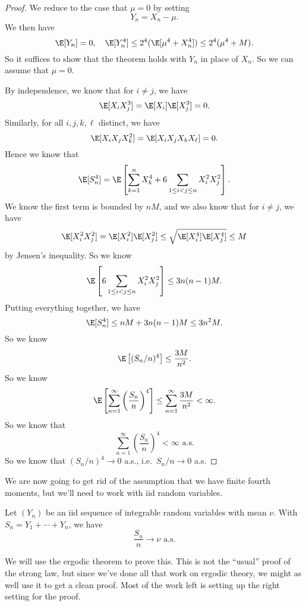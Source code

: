 \documentclass[a4paper]{article}
\begin{document}
\begin{proof}
  We reduce to the case that $\mu = 0$ by setting
  \[
    Y_n = X_n - \mu.
  \]
  We then have
  \[
    \E[Y_n] = 0,\quad \E[Y_n^4] \leq 2^4(\E[\mu^4 + X_n^4]) \leq 2^4(\mu^4 + M).
  \]
  So it suffices to show that the theorem holds with $Y_n$ in place of $X_n$. So we can assume that $\mu = 0$.

  By independence, we know that for $i \not= j$, we have
  \[
    \E[X_i X_j^3] = \E[X_i] \E[X_j^3] = 0.
  \]
  Similarly, for all $i, j, k, \ell$ distinct, we have
  \[
    \E[X_i X_j X_k^2] = \E[X_i X_j X_k X_\ell] = 0.
  \]
  Hence we know that
  \[
    \E[S_n^4] = \E\left[\sum_{k = 1}^n X_k^4 + 6 \sum_{1 \leq i < j \leq n} X_i^2 X_j^2\right].
  \]
  We know the first term is bounded by $nM$, and we also know that for $i \not= j$, we have
  \[
    \E[X_i^2 X_j^2] = \E[X_i^2] \E[X_j^2] \leq \sqrt{\E[X_i^4] \E[X_j^4]} \leq M
  \]
  by Jensen's inequality. So we know
  \[
    \E\left[6 \sum_{1 \leq i < j\leq n} X_i^2 X_j^2\right] \leq 3n(n - 1)M.
  \]
  Putting everything together, we have
  \[
    \E[S_n^4] \leq nM + 3n(n - 1)M \leq 3n^2 M.
  \]
  So we know
  \[
    \E\left[(S_n/n)^4\right] \leq \frac{3M}{n^2}.
  \]
  So we know
  \[
    \E \left[\sum_{n = 1}^\infty \left(\frac{S_n}{n}\right)^4\right] \leq \sum_{n = 1}^\infty \frac{3M}{n^2} < \infty.
  \]
  So we know that
  \[
    \sum_{n = 1}^\infty \left(\frac{S_n}{n}\right)^4 < \infty \text{ a.s.}
  \]
  So we know that $(S_n/n)^4 \to 0$ a.s., i.e.\ $S_n/n \to 0$ a.s.
\end{proof}

We are now going to get rid of the assumption that we have finite fourth moments, but we'll need to work with iid random variables.

\begin{thm}
  Let $(Y_n)$ be an iid sequence of integrable random variables with mean $\nu$. With $S_n = Y_1 + \cdots + Y_n$, we have
  \[
    \frac{S_n}{n} \to \nu \text{ a.s.}
  \]
\end{thm}

We will use the ergodic theorem to prove this. This is not the ``usual'' proof of the strong law, but since we've done all that work on ergodic theory, we might as well use it to get a clean proof. Most of the work left is setting up the right setting for the proof.
\end{document}
